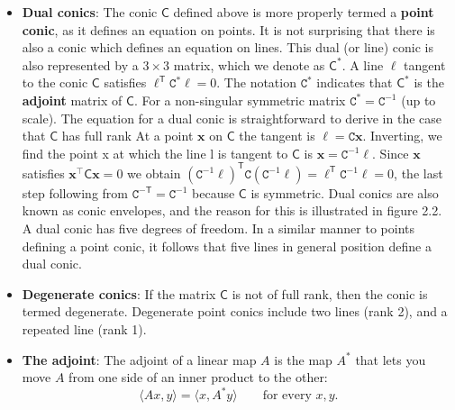 \documentclass{report}
\begin{document}
\begin{itemize}
            Thus, it must be that the whole line $\mathbf{\ell} = \mathsf{C}\mathbf{x}$ lies on the conic $\mathsf{C}$, which would be degenerate.
        \item \textbf{Dual conics}: The conic $\mathsf{C}$ defined above is more properly termed a \textbf{point conic}, as it defines an equation on points.
            \bigbreak \noindent 
            It is not surprising that there is also a conic which defines an equation on lines. This dual (or line) conic is also represented by a $3\times 3$ matrix, which we denote as $\mathsf{C}^{*}$. A line $\mathbf{\ell}$ tangent to the conic $\mathsf{C}$ satisfies $\mathbf{\ell}^{\mathsf{T}}\mathtt{C}^{*}\mathbf{\ell}=0$. The notation $\mathtt{C}^{*}$ indicates that $\mathsf{C}^{*}$ is the \textbf{adjoint} matrix of $\mathsf{C}$. For a non-singular symmetric matrix $\mathtt{C}^{*}=\mathtt{C}^{-1}$ (up to scale).
            \bigbreak \noindent 
            The equation for a dual conic is straightforward to derive in the case that $\mathsf{C}$ has full rank
            \bigbreak \noindent 
            At a point $\mathbf{x}$ on $\mathsf{C}$ the tangent is $\mathbf{\ell}=\mathtt{C}\mathbf{x}$. Inverting, we find the point x at which the line l is tangent to $\mathsf{C}$ is $\mathbf{x}=\mathtt{C}^{-1}\mathbf{\ell}$. Since $\mathbf{x}$ satisfies $\mathbf{x}^{\mathsf{\top}}\mathsf{C}\mathbf{x} = 0$  we obtain $(\mathtt{C}^{-1}\mathbf{\ell})^{\mathsf{T}}\mathtt{C}(\mathtt{C}^{-1}\mathbf{\ell})=\mathbf{\ell}^{\mathsf{T}}\mathtt{C}^{-1}\mathbf{\ell}=0$, the last step following from $\mathtt{C}^{-\mathsf{T}}=\mathtt{C}^{-1}$ because $\mathsf{C}$ is symmetric.
            \bigbreak \noindent 
            Dual conics are also known as conic envelopes, and the reason for this is illustrated in figure 2.2. A dual conic has five degrees of freedom. In a similar manner to points defining a point conic, it follows that five lines in general position define a dual conic.
            \bigbreak \noindent 
        \item \textbf{Degenerate conics}: If the matrix $\mathsf{C}$ is not of full rank, then the conic is termed degenerate. Degenerate point conics include two lines (rank 2), and a repeated line (rank 1).
        \item \textbf{The adjoint}: The adjoint of a linear map \(A\) is the map \(A^*\) that lets you move \(A\) from one side of an inner product to the other:
            \[
                \langle Ax,y\rangle=\langle x,A^*y\rangle \qquad\text{for every }x,y.
            \]

\end{itemize}
\end{document}
